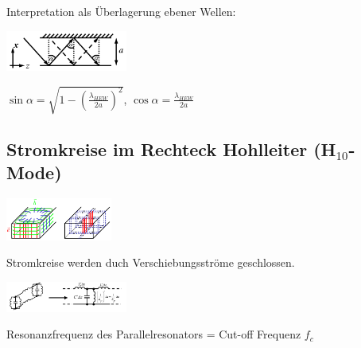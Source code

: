 \documentclass[english]{latex4ei/latex4ei_sheet}
\begin{document}
\begin{sectionbox}
	Interpretation als Überlagerung ebener Wellen:\\
	\begin{center}\includegraphics[width = 4cm]{./img/hohlleiter-reflexion.png}\end{center}
	$\sin \alpha=\sqrt{1-\left(\frac{\lambda_{H E W}}{2 a}\right)^{2}}$, $\cos \alpha=\frac{\lambda_{H E W}}{2 a}$\\
\end{sectionbox}

\begin{sectionbox}
	\subsection{Stromkreise im Rechteck Hohlleiter (H$_{10}$-Mode)}
	\begin{center}\includegraphics[width = 3.5cm]{./img/stromkreise-hl.jpeg}\end{center}
	Stromkreise werden duch Verschiebungsströme geschlossen.
	\begin{center}\includegraphics[width = 4cm]{./img/strom-hl.jpeg}\end{center}
	Resonanzfrequenz des Parallelresonators = Cut-off Frequenz $f_c$
\end{sectionbox}
\end{document}
